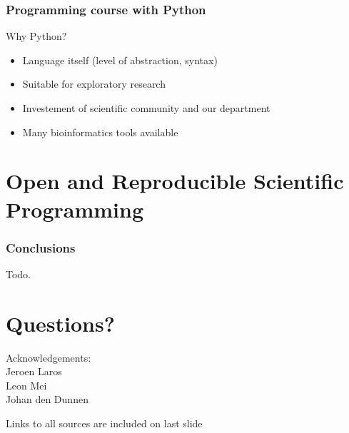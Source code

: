\documentclass[slidestop]{beamer}
\begin{document}
{
  \frame{}
}

\begin{frame}
  \frametitle{Programming course with Python}
  Why Python?
  \begin{itemize}
    \item Language itself (level of abstraction, syntax)
    \item Suitable for exploratory research
    \item Investement of scientific community and our department
    \item Many bioinformatics tools available
  \end{itemize}
\end{frame}

\section*{Open and Reproducible Scientific Programming}

\begin{frame}
  \frametitle{Conclusions}
  Todo.
\end{frame}

\section*{Questions?}
\lastpagetemplate
\begin{frame}
  \begin{center}
    Acknowledgements:\\
    \vspace{0.8cm}
    Jeroen Laros\\
    Leon Mei\\
    Johan den Dunnen
  \end{center}
  \vspace{1cm}
  {\tiny
    Links to all sources are included on last slide
  }
\end{frame}
\end{document}
